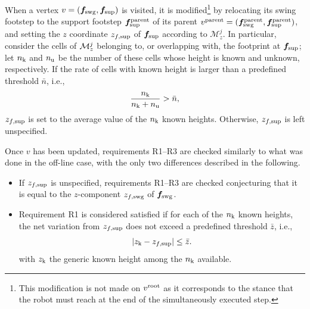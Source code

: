 When a vertex $v = ({\bm{f}}_{\rm swg}, {\bm{f}}_{\rm sup})$ is visited, it is
modified\footnote{This modification is not made on $v^{\rm root}$ as it
corresponds to the stance that the robot must reach at the end of the
simultaneously executed step.} by relocating its swing footstep to the support
footstep ${\bm{f}}_{\rm sup}^{\rm parent}$ of its parent
$v^{\rm parent} = ({\bm{f}}_{\rm swg}^{\rm parent}, {\bm{f}}_{\rm sup}^{\rm parent})$,
and setting the $z$ coordinate $z_{f, \rm sup}$ of ${\bm{f}}_{\rm sup}$ according
to $\mathcal{M}_z^{j}$.
In particular, consider the cells of ${\cal M}_z^j$ belonging to, or
overlapping with, the footprint at ${\bm{f}}_{\rm sup}$; let $n_{\rm k}$ and
$n_{\rm u}$ be the number of these cells whose height is known and unknown,
respectively. If the rate of cells with known height is larger than a predefined
threshold $\bar{n}$, i.e.,
\begin{equation*}
    \frac{n_{\rm k}}{n_{\rm k} + n_{\rm u}} > \bar{n},    
\end{equation*}
$z_{f, \rm sup}$ is set to the average value of the $n_{\rm k}$ known heights. 
Otherwise, $z_{f, \rm sup}$ is left unspecified.

Once $v$ has been updated, requirements R1--R3 are checked similarly to what
was done in the off-line case, with the only two differences described in the
following.
\begin{itemize}
    \item If $z_{f, \rm sup}$ is unspecified, requirements R1--R3 are checked
        conjecturing that it is equal to the $z$-component $z_{f, \rm swg}$ of
        ${\bm{f}}_{\rm swg}$.
    \item Requirement R1 is considered satisfied if for each of the $n_{\rm k}$
        known heights, the net variation from $z_{f, \rm sup}$ does not exceed
        a predefined threshold $\bar{z}$, i.e.,
        \begin{equation*}
            |z_{\rm k} - z_{f, \rm sup}| \leq \bar{z}.
        \end{equation*}
        with $z_{\rm k}$ the generic known height among the $n_{\rm k}$ available.
\end{itemize}

